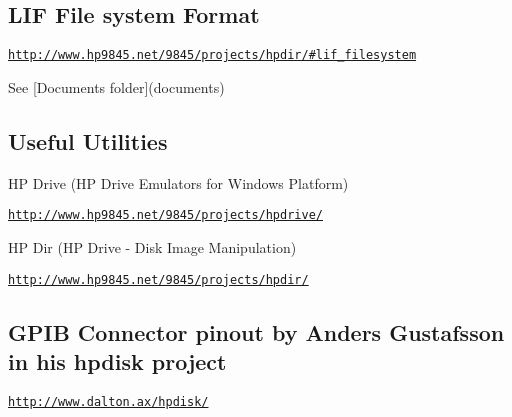 \subsection*{L\+IF File system Format}


\begin{DoxyItemize}
\item \href{http://www.hp9845.net/9845/projects/hpdir/#lif_filesystem}{\tt http\+://www.\+hp9845.\+net/9845/projects/hpdir/\#lif\+\_\+filesystem}
\item See \mbox{[}Documents folder\mbox{]}(documents) 


\end{DoxyItemize}

\subsection*{Useful Utilities}


\begin{DoxyItemize}
\item HP Drive (HP Drive Emulators for Windows Platform)
\begin{DoxyItemize}
\item \href{http://www.hp9845.net/9845/projects/hpdrive/}{\tt http\+://www.\+hp9845.\+net/9845/projects/hpdrive/}
\end{DoxyItemize}
\item HP Dir (HP Drive -\/ Disk Image Manipulation)
\begin{DoxyItemize}
\item \href{http://www.hp9845.net/9845/projects/hpdir/}{\tt http\+://www.\+hp9845.\+net/9845/projects/hpdir/} 


\end{DoxyItemize}
\end{DoxyItemize}

\subsection*{G\+P\+IB Connector pinout by Anders Gustafsson in his hpdisk project}


\begin{DoxyItemize}
\item \href{http://www.dalton.ax/hpdisk/}{\tt http\+://www.\+dalton.\+ax/hpdisk/}
\end{DoxyItemize}


